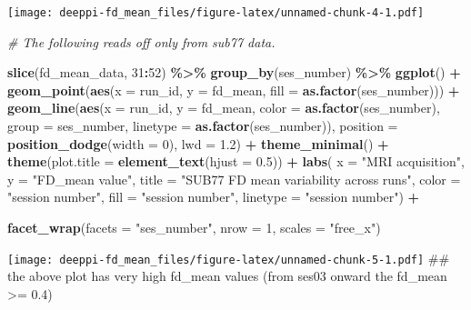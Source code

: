 \documentclass[
]{article}
\newenvironment{Shaded}{\begin{snugshade}}{\end{snugshade}}
\newcommand{\AttributeTok}[1]{\textcolor[rgb]{0.13,0.29,0.53}{#1}}
\newcommand{\CommentTok}[1]{\textcolor[rgb]{0.56,0.35,0.01}{\textit{#1}}}
\newcommand{\DecValTok}[1]{\textcolor[rgb]{0.00,0.00,0.81}{#1}}
\newcommand{\FloatTok}[1]{\textcolor[rgb]{0.00,0.00,0.81}{#1}}
\newcommand{\FunctionTok}[1]{\textcolor[rgb]{0.13,0.29,0.53}{\textbf{#1}}}
\newcommand{\NormalTok}[1]{#1}
\newcommand{\SpecialCharTok}[1]{\textcolor[rgb]{0.81,0.36,0.00}{\textbf{#1}}}
\newcommand{\StringTok}[1]{\textcolor[rgb]{0.31,0.60,0.02}{#1}}
\begin{document}
\texttt{[image: deeppi-fd\_mean\_files/figure-latex/unnamed-chunk-4-1.pdf]}

\begin{Shaded}
\begin{Highlighting}[]
\CommentTok{\# The following reads off only from sub77 data. }

\FunctionTok{slice}\NormalTok{(fd\_mean\_data, }\DecValTok{31}\SpecialCharTok{:}\DecValTok{52}\NormalTok{) }\SpecialCharTok{\%\textgreater{}\%}
  \FunctionTok{group\_by}\NormalTok{(ses\_number) }\SpecialCharTok{\%\textgreater{}\%}
    \FunctionTok{ggplot}\NormalTok{() }\SpecialCharTok{+} 
    \FunctionTok{geom\_point}\NormalTok{(}\FunctionTok{aes}\NormalTok{(}\AttributeTok{x =}\NormalTok{ run\_id, }\AttributeTok{y =}\NormalTok{ fd\_mean, }\AttributeTok{fill =} \FunctionTok{as.factor}\NormalTok{(ses\_number))) }\SpecialCharTok{+}
    \FunctionTok{geom\_line}\NormalTok{(}\FunctionTok{aes}\NormalTok{(}\AttributeTok{x =}\NormalTok{ run\_id, }\AttributeTok{y =}\NormalTok{ fd\_mean, }\AttributeTok{color =} \FunctionTok{as.factor}\NormalTok{(ses\_number), }
                  \AttributeTok{group =}\NormalTok{ ses\_number, }\AttributeTok{linetype =} \FunctionTok{as.factor}\NormalTok{(ses\_number)), }
              \AttributeTok{position =} \FunctionTok{position\_dodge}\NormalTok{(}\AttributeTok{width =} \DecValTok{0}\NormalTok{), }\AttributeTok{lwd =} \FloatTok{1.2}\NormalTok{) }\SpecialCharTok{+}
    \FunctionTok{theme\_minimal}\NormalTok{() }\SpecialCharTok{+}
    \FunctionTok{theme}\NormalTok{(}\AttributeTok{plot.title =} \FunctionTok{element\_text}\NormalTok{(}\AttributeTok{hjust =} \FloatTok{0.5}\NormalTok{)) }\SpecialCharTok{+}
    \FunctionTok{labs}\NormalTok{(}
    \AttributeTok{x =} \StringTok{"MRI acquisition"}\NormalTok{, }
    \AttributeTok{y =} \StringTok{"FD\_mean value"}\NormalTok{, }
    \AttributeTok{title =} \StringTok{"SUB77 FD mean variability across runs"}\NormalTok{,}
    \AttributeTok{color =} \StringTok{"session number"}\NormalTok{,}
    \AttributeTok{fill =} \StringTok{"session number"}\NormalTok{,}
    \AttributeTok{linetype =} \StringTok{"session number"}\NormalTok{) }\SpecialCharTok{+} 

    \FunctionTok{facet\_wrap}\NormalTok{(}\AttributeTok{facets =} \StringTok{"ses\_number"}\NormalTok{, }\AttributeTok{nrow =} \DecValTok{1}\NormalTok{, }\AttributeTok{scales =} \StringTok{"free\_x"}\NormalTok{) }
\end{Highlighting}
\end{Shaded}

\texttt{[image: deeppi-fd\_mean\_files/figure-latex/unnamed-chunk-5-1.pdf]}
\#\# the above plot has very high fd\_mean values (from ses03 onward the
fd\_mean \textgreater= 0.4)
\end{document}
